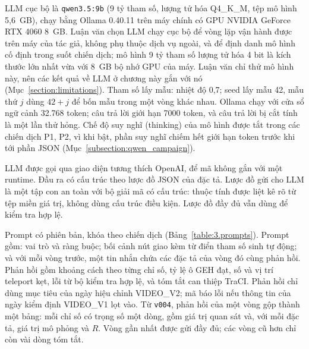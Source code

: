 \documentclass[../main.tex]{subfiles}
\begin{document}
LLM cục bộ là \texttt{qwen3.5:9b} (9 tỷ tham số, lượng tử hóa Q4\_K\_M, tệp mô hình 5,6~GB), chạy bằng Ollama 0.40.11 trên máy chính có GPU NVIDIA GeForce RTX 4060 8~GB. Luận văn chọn LLM chạy cục bộ để vòng lặp vận hành được trên máy của tác giả, không phụ thuộc dịch vụ ngoài, và để định danh mô hình cố định trong suốt chiến dịch; mô hình 9 tỷ tham số lượng tử hóa 4 bit là kích thước lớn nhất vừa với 8~GB bộ nhớ GPU của máy. Luận văn chỉ thử mô hình này, nên các kết quả về LLM ở chương này gắn với nó (Mục~\ref{section:limitations}). Tham số lấy mẫu: nhiệt độ 0,7; seed lấy mẫu 42, mẫu thứ $j$ dùng $42 + j$ để bốn mẫu trong một vòng khác nhau. Ollama chạy với cửa sổ ngữ cảnh 32.768 token; câu trả lời giới hạn 7000 token, và câu trả lời bị cắt tính là một lần thử hỏng. Chế độ suy nghĩ (thinking) của mô hình được tắt trong các chiến dịch P1, P2, vì khi bật, phần suy nghĩ chiếm hết giới hạn token trước khi tới phần JSON (Mục~\ref{subsection:qwen_campaign}).

LLM được gọi qua giao diện tương thích OpenAI, để mã không gắn với một runtime. Đầu ra có cấu trúc theo lược đồ JSON của đặc tả. Lược đồ gửi cho LLM là một tập con an toàn với bộ giải mã có cấu trúc: thuộc tính được liệt kê rõ từ tệp miền giá trị, không dùng cấu trúc điều kiện. Lược đồ đầy đủ vẫn dùng để kiểm tra hợp lệ.

Prompt có phiên bản, khóa theo chiến dịch (Bảng~\ref{table:3.prompts}). Prompt gồm: vai trò và ràng buộc; bối cảnh nút giao kèm từ điển tham số sinh tự động; và với mỗi vòng trước, một tin nhắn chứa các đặc tả của vòng đó cùng phản hồi. Phản hồi gồm khoảng cách theo từng chỉ số, tỷ lệ ô GEH đạt, số và vị trí teleport kẹt, lỗi từ bộ kiểm tra hợp lệ, và tóm tắt can thiệp TraCI. Phản hồi chỉ dùng mục tiêu của ngày hiệu chỉnh VIDEO\_V2; mã báo lỗi nếu thông tin của ngày kiểm định VIDEO\_V1 lọt vào. Từ \texttt{v004}, phản hồi của một vòng gộp thành một bảng: mỗi chỉ số có trọng số một dòng, gồm giá trị quan sát và, với mỗi đặc tả, giá trị mô phỏng và $R$. Vòng gần nhất được gửi đầy đủ; các vòng cũ hơn chỉ còn vài dòng tóm tắt.
\end{document}
